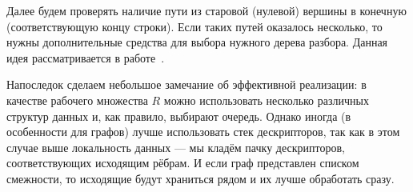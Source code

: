 \begin{center}
\end{center}

Далее будем проверять наличие пути из старовой (нулевой) вершины в конечную (соответствующую концу строки). Если таких путей оказалось несколько, то нужны дополнительные средства для выбора нужного дерева разбора. Данная идея рассматривается в работе~\cite{10.1145/3357766.3359532}.

Напоследок сделаем небольшое замечание об эффективной реализации: в качестве рабочего множества $ R $ можно использовать несколько различных структур данных и, как правило, выбирают очередь. Однако иногда (в особенности для графов) лучше использовать стек дескрипторов, так как в этом случае выше локальность данных --- мы кладём пачку дескрипторов, соответствующих исходящим рёбрам. И если граф представлен списком смежности, то исходящие будут храниться рядом и их лучше обработать сразу.


